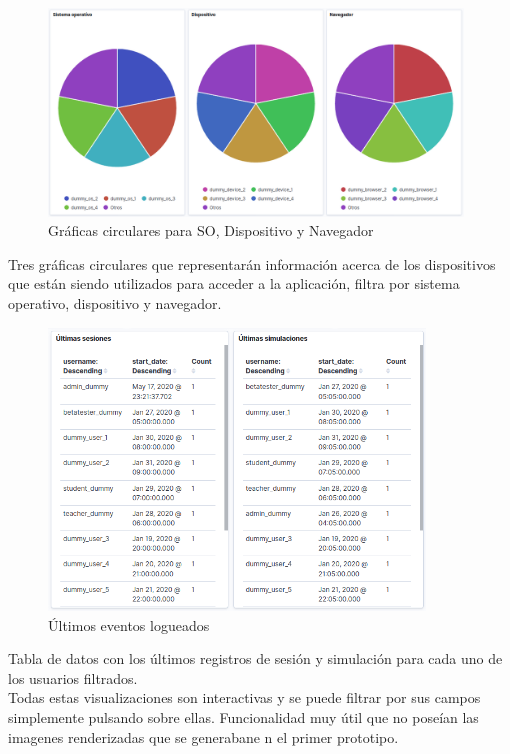 \documentclass[11pt,a4paper]{book}
\begin{document}
				\begin{figure}[H]
					\centering
					\includegraphics[width=11cm, keepaspectratio]{img/kibana_07_pie}
					\caption{Gráficas circulares para SO, Dispositivo y Navegador}
					\label{fig:kibana_pie}
				\end{figure}
				Tres gráficas circulares que representarán información acerca de los dispositivos que están siendo utilizados para acceder a la aplicación, filtra por sistema operativo, dispositivo y navegador.\\
				
				\begin{figure}[H]
					\centering
					\includegraphics[width=10cm, keepaspectratio]{img/kibana_08_latest_event}
					\caption{Últimos eventos logueados}
					\label{fig:kibana_latestevent}
				\end{figure}
				Tabla de datos con los últimos registros de sesión y simulación para cada uno de los usuarios filtrados.\\
				
				Todas estas visualizaciones son interactivas y se puede filtrar por sus campos simplemente pulsando sobre ellas. Funcionalidad muy útil que no poseían las imagenes renderizadas que se generabane n el primer prototipo.\\
					
\end{document}

